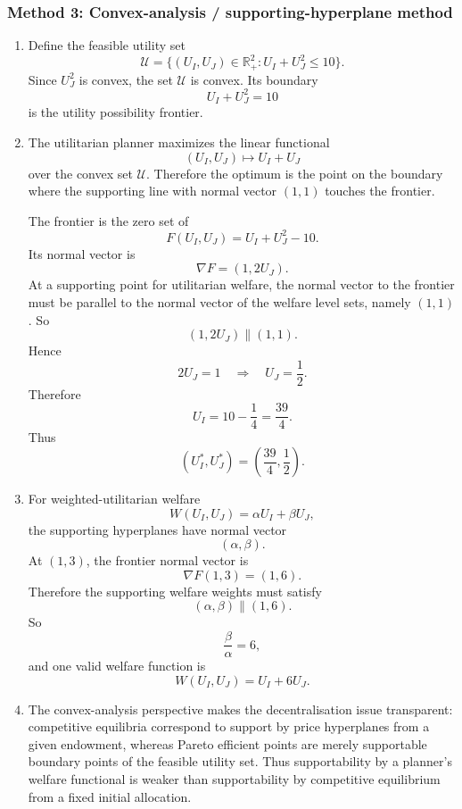 \documentclass[12pt]{article}
\newcommand{\R}{\mathbb{R}}
\begin{document}
\newpage
\subsubsection{Method 3: Convex-analysis / supporting-hyperplane method}

\begin{enumerate}[label=(\alph*)]
    \item
    Define the feasible utility set
    \[
    \mathcal U=\{(U_I,U_J)\in \R_+^2: U_I+U_J^2\le 10\}.
    \]
    Since \(U_J^2\) is convex, the set \(\mathcal U\) is convex. Its boundary
    \[
    U_I+U_J^2=10
    \]
    is the utility possibility frontier.

    \item
    The utilitarian planner maximizes the linear functional
    \[
    (U_I,U_J)\mapsto U_I+U_J
    \]
    over the convex set \(\mathcal U\). Therefore the optimum is the point on the boundary where the supporting line with normal vector \((1,1)\) touches the frontier.

    The frontier is the zero set of
    \[
    F(U_I,U_J)=U_I+U_J^2-10.
    \]
    Its normal vector is
    \[
    \nabla F=(1,2U_J).
    \]
    At a supporting point for utilitarian welfare, the normal vector to the frontier must be parallel to the normal vector of the welfare level sets, namely \((1,1)\). So
    \[
    (1,2U_J)\parallel (1,1).
    \]
    Hence
    \[
    2U_J=1
    \quad\Longrightarrow\quad
    U_J=\frac12.
    \]
    Therefore
    \[
    U_I=10-\frac14=\frac{39}{4}.
    \]
    Thus
    \[
    \boxed{\left(U_I^*,U_J^*\right)=\left(\frac{39}{4},\frac12\right).}
    \]

    \item
    For weighted-utilitarian welfare
    \[
    W(U_I,U_J)=\alpha U_I+\beta U_J,
    \]
    the supporting hyperplanes have normal vector
    \[
    (\alpha,\beta).
    \]
    At \((1,3)\), the frontier normal vector is
    \[
    \nabla F(1,3)=(1,6).
    \]
    Therefore the supporting welfare weights must satisfy
    \[
    (\alpha,\beta)\parallel (1,6).
    \]
    So
    \[
    \boxed{\frac{\beta}{\alpha}=6,}
    \]
    and one valid welfare function is
    \[
    \boxed{W(U_I,U_J)=U_I+6U_J.}
    \]

    \item
    The convex-analysis perspective makes the decentralisation issue transparent: competitive equilibria correspond to support by price hyperplanes from a given endowment, whereas Pareto efficient points are merely supportable boundary points of the feasible utility set. Thus supportability by a planner's welfare functional is weaker than supportability by competitive equilibrium from a fixed initial allocation.
\end{enumerate}
\end{document}
